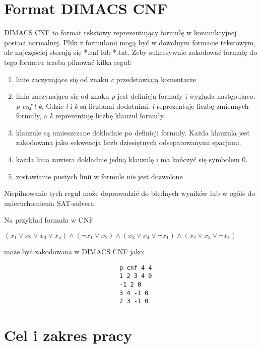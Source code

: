 \documentclass[a4paper,12pt,oneside]{book}
\theoremstyle{definition}
\begin{document}
\section{Format DIMACS CNF}

DIMACS CNF to format tekstowy reprezentujący formułę w koniunkcyjnej postaci normalnej. Pliki z formułami mogą być w dowolnym formacie tekstowym, ale najczęściej stosują się *.cnf lub *.txt. Żeby sukcesywnie zakodować formułę do tego formatu trzeba pilnować kilka reguł: 

\begin{enumerate}
    \item linie zaczynające się od znaku \textit{c} przedstawiają komentarze
    \item linia zaczynająca się od znaku \textit{p} jest definicją formuły i wygląda następująco: \textit{p cnf l k}. Gdzie \textit{l} i \textit{k} są liczbami dodatnimi. \textit{l} reprezentuje liczbę zmiennych formuły, a \textit{k} reprezentuję liczbę klauzul formuły.
    \item klauzule są umieszczane dokładnie po definicji formuły. Każda klauzula jest zakodowana jako sekwencja liczb dziesiętnych odseparowanymi spacjami.
    \item każda linia zawiera dokładnie jedną klauzulę i ma kończyć się symbolem 0.
    \item zostawianie pustych linii w formule nie jest dozwolone
\end{enumerate}
Niepilnowanie tych reguł może doprowadzić do błędnych wyników lub w ogóle do unieruchomienia SAT-solvera.

Na przykład formuła w CNF

\begin{center}
    $(x_1 \lor x_2 \lor x_3 \lor x_4) \land (\neg x_1 \lor x_2) \land (x_3 \lor x_4 \lor \neg x_1) \land (x_2 \lor x_3 \lor \neg x_1)$ 
\end{center}

może być zakodowana w DIMACS CNF jako:

\begin{verbatim}
                                p cnf 4 4
                                1 2 3 4 0
                                -1 2 0
                                3 4 -1 0
                                2 3 -1 0
\end{verbatim}

\section{Cel i zakres pracy}
\end{document}
